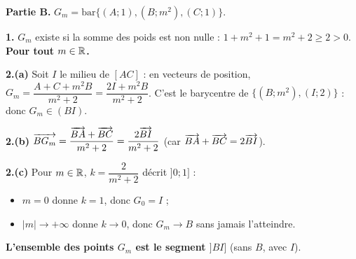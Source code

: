 \textbf{Partie B.} $G_m=\mathrm{bar}\{(A;1),(B;m^2),(C;1)\}$.

\textbf{1.} $G_m$ existe si la somme des poids est non nulle : $1+m^2+1=m^2+2\ge2>0$. \textbf{Pour tout $m\in\mathbb{R}$.}

\textbf{2.(a)} Soit $I$ le milieu de $[AC]$ : en vecteurs de position, $G_m=\dfrac{A+C+m^2B}{m^2+2}=\dfrac{2I+m^2B}{m^2+2}$.
C'est le barycentre de $\{(B;m^2),(I;2)\}$ : donc $G_m\in(BI)$.

\textbf{2.(b)} $\overrightarrow{BG_m}=\dfrac{\overrightarrow{BA}+\overrightarrow{BC}}{m^2+2}=\dfrac{2\overrightarrow{BI}}{m^2+2}$ (car $\overrightarrow{BA}+\overrightarrow{BC}=2\overrightarrow{BI}$).

\textbf{2.(c)} Pour $m\in\mathbb{R}$, $k=\dfrac{2}{m^2+2}$ d\'ecrit $]0;1]$ :
\begin{itemize}
  \item $m=0$ donne $k=1$, donc $G_0=I$ ;
  \item $|m|\to+\infty$ donne $k\to0$, donc $G_m\to B$ sans jamais l'atteindre.
\end{itemize}
\textbf{L'ensemble des points $G_m$ est le segment $]BI]$} (sans $B$, avec $I$).
